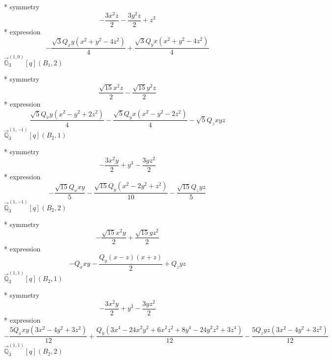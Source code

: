 \documentclass[fleqn,8pt]{jsarticle}
\begin{document}
\noindent\quad ** symmetry
\begin{dmath*}
- \frac{3 x^{2} z}{2} - \frac{3 y^{2} z}{2} + z^{3}
\end{dmath*}
\noindent\quad ** expression
\begin{dmath*}
- \frac{\sqrt{3} Q_{x} y \left(x^{2} + y^{2} - 4 z^{2}\right)}{4} + \frac{\sqrt{3} Q_{y} x \left(x^{2} + y^{2} - 4 z^{2}\right)}{4}
\end{dmath*}
\noindent\quad $\vec{\mathbb{G}}_{3}^{(1,0)}[q](B_{1},2)$

\noindent\quad ** symmetry
\begin{dmath*}
\frac{\sqrt{15} x^{2} z}{2} - \frac{\sqrt{15} y^{2} z}{2}
\end{dmath*}
\noindent\quad ** expression
\begin{dmath*}
\frac{\sqrt{5} Q_{x} y \left(x^{2} - y^{2} + 2 z^{2}\right)}{4} - \frac{\sqrt{5} Q_{y} x \left(x^{2} - y^{2} - 2 z^{2}\right)}{4} - \sqrt{5} Q_{z} x y z
\end{dmath*}
\noindent\quad $\vec{\mathbb{Q}}_{3}^{(1,-1)}[q](B_{2},1)$

\noindent\quad ** symmetry
\begin{dmath*}
- \frac{3 x^{2} y}{2} + y^{3} - \frac{3 y z^{2}}{2}
\end{dmath*}
\noindent\quad ** expression
\begin{dmath*}
- \frac{\sqrt{15} Q_{x} x y}{5} - \frac{\sqrt{15} Q_{y} \left(x^{2} - 2 y^{2} + z^{2}\right)}{10} - \frac{\sqrt{15} Q_{z} y z}{5}
\end{dmath*}
\noindent\quad $\vec{\mathbb{Q}}_{3}^{(1,-1)}[q](B_{2},2)$

\noindent\quad ** symmetry
\begin{dmath*}
- \frac{\sqrt{15} x^{2} y}{2} + \frac{\sqrt{15} y z^{2}}{2}
\end{dmath*}
\noindent\quad ** expression
\begin{dmath*}
- Q_{x} x y - \frac{Q_{y} \left(x - z\right) \left(x + z\right)}{2} + Q_{z} y z
\end{dmath*}
\noindent\quad $\vec{\mathbb{Q}}_{3}^{(1,1)}[q](B_{2},1)$

\noindent\quad ** symmetry
\begin{dmath*}
- \frac{3 x^{2} y}{2} + y^{3} - \frac{3 y z^{2}}{2}
\end{dmath*}
\noindent\quad ** expression
\begin{dmath*}
- \frac{5 Q_{x} x y \left(3 x^{2} - 4 y^{2} + 3 z^{2}\right)}{12} + \frac{Q_{y} \left(3 x^{4} - 24 x^{2} y^{2} + 6 x^{2} z^{2} + 8 y^{4} - 24 y^{2} z^{2} + 3 z^{4}\right)}{12} - \frac{5 Q_{z} y z \left(3 x^{2} - 4 y^{2} + 3 z^{2}\right)}{12}
\end{dmath*}
\noindent\quad $\vec{\mathbb{Q}}_{3}^{(1,1)}[q](B_{2},2)$
\end{document}
